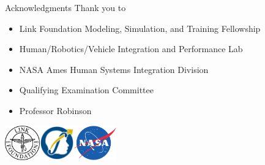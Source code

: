 \documentclass[10pt]{beamer}
\begin{document}
\begin{frame}[fragile]{Acknowledgments}
  Thank you to
  \begin{itemize}
    \item Link Foundation Modeling, Simulation, and Training Fellowship
    \item Human/Robotics/Vehicle Integration and Performance Lab
    \item NASA Ames Human Systems Integration Division
    \item Qualifying Examination Committee
    \item Professor Robinson
  \end{itemize}
  \hfill\includegraphics[height=1.5cm]{../img/linkfoundation.png}\includegraphics[height=1.5cm]{../img/hrvip.png}\includegraphics[height=1.5cm]{../img/nasa.png}
\end{frame}

{ %
    \begin{frame}[plain]
     \end{frame}
}
\end{document}
